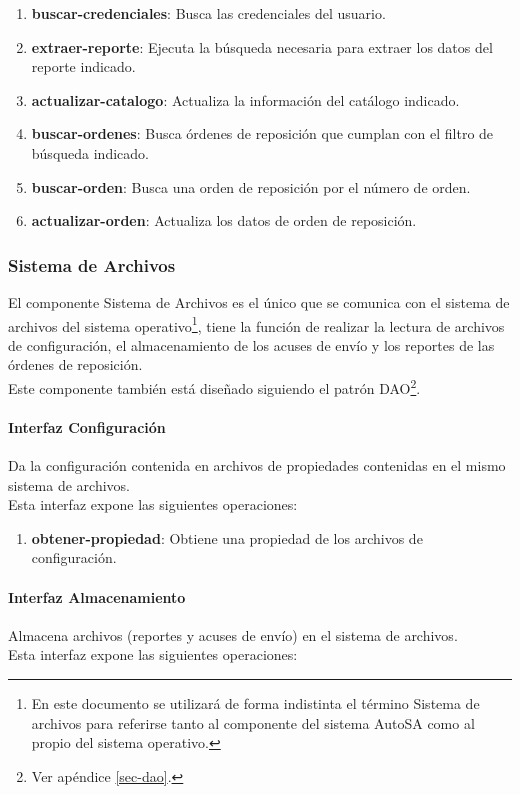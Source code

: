 \begin{enumerate}
	\item \textbf{buscar-credenciales}: Busca las credenciales del usuario.
	\item \textbf{extraer-reporte}: Ejecuta la búsqueda necesaria para extraer los datos del reporte indicado.
	\item \textbf{actualizar-catalogo}: Actualiza la información del catálogo indicado.
	\item \textbf{buscar-ordenes}: Busca órdenes de reposición que cumplan con el filtro de búsqueda indicado.
	\item \textbf{buscar-orden}: Busca una orden de reposición por el número de orden.
	\item \textbf{actualizar-orden}: Actualiza los datos de orden de reposición.
\end{enumerate}

\subsubsection{Sistema de Archivos}
El componente Sistema de Archivos es el único que se comunica con el sistema de archivos del sistema operativo\footnote{En este documento se utilizará de forma indistinta el término Sistema de archivos para referirse tanto al componente del sistema AutoSA como al propio del sistema operativo.}, tiene la función de realizar la lectura de archivos de configuración, el almacenamiento de los acuses de envío  y los reportes de las órdenes de reposición.\\
Este componente también está diseñado siguiendo el patrón DAO\footnote{Ver apéndice \ref{sec-dao}.}.
\paragraph{Interfaz Configuración\\}
Da la configuración contenida en archivos de propiedades contenidas en el mismo sistema de archivos.\\
Esta interfaz expone las siguientes operaciones:

\begin{enumerate}
	\item \textbf{obtener-propiedad}: Obtiene una propiedad de los archivos de configuración.
\end{enumerate}

\paragraph{Interfaz Almacenamiento\\}
Almacena archivos (reportes y acuses de envío) en el sistema de archivos.\\
Esta interfaz expone las siguientes operaciones:


